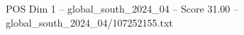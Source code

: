\begin{textsample}{POS Dim 1 – global\_south\_2024\_04 – Score 31.00 – global\_south\_2024\_04/107252155.txt}
\end{textsample}
